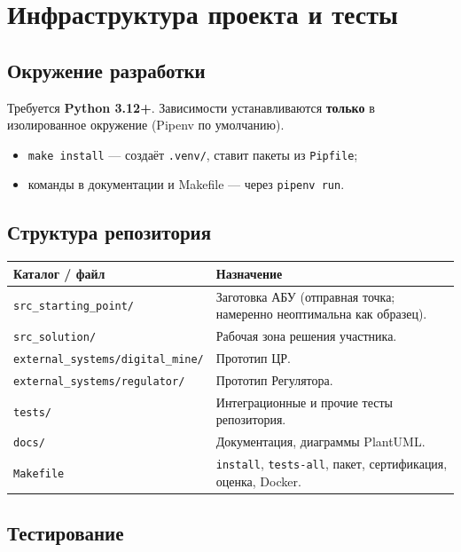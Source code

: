\chapter{Инфраструктура проекта и тесты}
\label{ch:infra}

\section{Окружение разработки}

Требуется \textbf{Python 3.12+}. Зависимости устанавливаются \textbf{только} в изолированное окружение (Pipenv по умолчанию).

\begin{itemize}
  \item \texttt{make install} --- создаёт \texttt{.venv/}, ставит пакеты из \texttt{Pipfile};
  \item команды в документации и Makefile --- через \texttt{pipenv run}.
\end{itemize}

\section{Структура репозитория}

\begin{tabularx}{\textwidth}{@{}l X@{}}
\toprule
\textbf{Каталог / файл} & \textbf{Назначение} \\
\midrule
\texttt{src\_starting\_point/} & Заготовка АБУ (отправная точка; намеренно неоптимальна как образец). \\
\texttt{src\_solution/} & Рабочая зона решения участника. \\
\texttt{external\_systems/digital\_mine/} & Прототип ЦР. \\
\texttt{external\_systems/regulator/} & Прототип Регулятора. \\
\texttt{tests/} & Интеграционные и прочие тесты репозитория. \\
\texttt{docs/} & Документация, диаграммы PlantUML. \\
\texttt{Makefile} & \texttt{install}, \texttt{tests-all}, пакет, сертификация, оценка, Docker. \\
\bottomrule
\end{tabularx}

\section{Тестирование}

